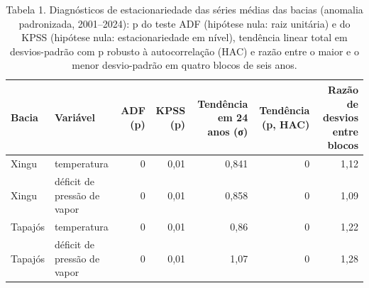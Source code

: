 \begin{table}
\caption{Tabela 1. Diagnósticos de estacionariedade das séries médias das bacias (anomalia padronizada, 2001–2024): p do teste ADF (hipótese nula: raiz unitária) e do KPSS (hipótese nula: estacionariedade em nível), tendência linear total em desvios-padrão com p robusto à autocorrelação (HAC) e razão entre o maior e o menor desvio-padrão em quatro blocos de seis anos.}
\label{tab:06_surrogates::estacionariedade}
\begin{tabular}{llrrrrr}
\toprule
Bacia & Variável & ADF (p) & KPSS (p) & Tendência em 24 anos (σ) & Tendência (p, HAC) & Razão de desvios entre blocos \\
\midrule
Xingu & temperatura & 0 & 0,01 & 0,841 & 0 & 1,12 \\
Xingu & déficit de pressão de vapor & 0 & 0,01 & 0,858 & 0 & 1,09 \\
Tapajós & temperatura & 0 & 0,01 & 0,86 & 0 & 1,22 \\
Tapajós & déficit de pressão de vapor & 0 & 0,01 & 1,07 & 0 & 1,28 \\
\bottomrule
\end{tabular}
\end{table}
